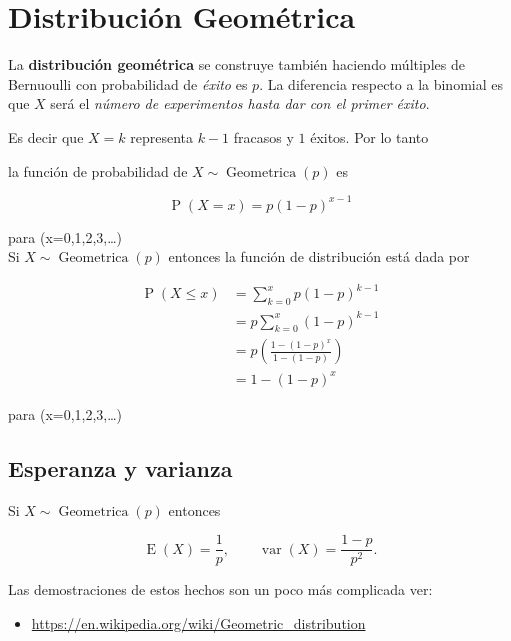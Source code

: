 \documentclass[]{book}
\providecommand{\tightlist}{%
  \setlength{\itemsep}{0pt}\setlength{\parskip}{0pt}}
\theoremstyle{plain}
\theoremstyle{definition}
\theoremstyle{definition} %
\begin{document}
\hypertarget{distribuciuxf3n-geomuxe9trica}{%
\section{Distribución Geométrica}\label{distribuciuxf3n-geomuxe9trica}}

La \textbf{distribución geométrica} se construye también haciendo
múltiples de Bernuoulli con probabilidad de \emph{éxito} es \(p\). La
diferencia respecto a la binomial es que \(X\) será el \emph{número de
experimentos hasta dar con el primer éxito}.

Es decir que \(X=k\) representa \(k-1\) fracasos y \(1\) éxitos. Por lo
tanto

la función de probabilidad de
\(\displaystyle X\sim \operatorname {Geometrica} (p)\) es

\[\displaystyle \operatorname {P} (X=x)=p(1-p)^{x-1}\]

para (x=0,1,2,3,\dots )\\

Si \(X\sim \operatorname {Geometrica} (p)\) entonces la función de
distribución está dada por

\[\begin{aligned}\operatorname {P} (X\leq x)&=\sum _{k=0}^{x}p(1-p)^{k-1}\\&=p\sum _{k=0}^{x}(1-p)^{k-1}\\&=p\left({\frac {1-(1-p)^{x}}{1-(1-p)}}\right)\\&=1-(1-p)^{x}\end{aligned}\]

para (x=0,1,2,3,\dots)

\hypertarget{esperanza-y-varianza}{%
\subsection{Esperanza y varianza}\label{esperanza-y-varianza}}

Si \(X\sim \operatorname {Geometrica} (p)\) entonces

\[\displaystyle \operatorname {E} (X)={\frac {1}{p}},\qquad \operatorname {var} (X)={\frac {1-p}{p^{2}}}.\]

Las demostraciones de estos hechos son un poco más complicada ver:

\begin{itemize}
\tightlist
\item
  \url{https://en.wikipedia.org/wiki/Geometric_distribution}
\end{itemize}
\end{document}
